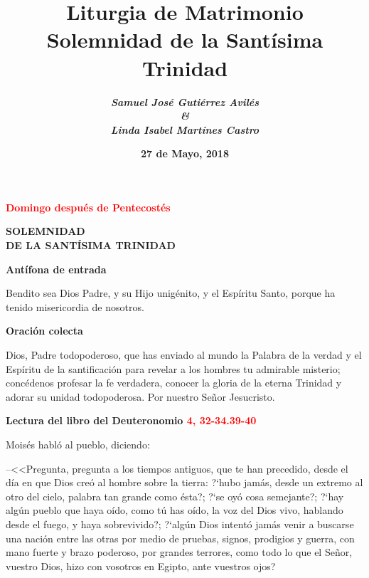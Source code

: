 \documentclass[12pt, letterpaper, spanish]{report}
\begin{document}
\title{%
	\Huge \bfseries Liturgia de Matrimonio \\
	\large Solemnidad de la Sant\'isima Trinidad
}
\author{%
	\Large \em \bfseries Samuel Jos\'e Guti\'errez Avil\'es \\ 
	\Large \em \bfseries \& \\ 
	\Large \em \bfseries Linda Isabel Mart\'ines Castro
}
\date{\bfseries 27 de Mayo, 2018}
\maketitle

\newpage

\begin{center} 
\Large {\bfseries \textcolor{red}{Domingo despu\'es de Pentecost\'es}}
\end{center}

\begin{center}
\huge {\bfseries SOLEMNIDAD \\ DE LA SANT\'ISIMA TRINIDAD}
\end{center}

\huge {\bfseries Ant\'ifona de entrada} \newline

\Large Bendito sea Dios Padre, y su Hijo unig\'enito, y el Esp\'iritu Santo, porque ha tenido misericordia de nosotros. \newline

\huge {\bfseries Oraci\'on colecta} \newline

\Large Dios, Padre todopoderoso, que has enviado al mundo la Palabra de la verdad
y el Esp\'iritu de la santificaci\'on para revelar a los hombres tu admirable misterio;
conc\'edenos profesar la fe verdadera, conocer la gloria de la eterna Trinidad
y adorar su unidad todopoderosa. Por nuestro Se\~nor Jesucristo. \newline

\Large {\bfseries Lectura del libro del Deuteronomio \hspace{1cm} \textcolor{red}{4, 32-34.39-40}} \newline

\Large Mois\'es habl\'o al pueblo, diciendo: \newline

--<<Pregunta, pregunta a los tiempos antiguos, que te han precedido, desde el d\'ia en que Dios 
cre\'o al hombre sobre la tierra: ?`hubo jam\'as, desde un extremo al otro del cielo, palabra tan 
grande como \'esta?; ?`se oy\'o cosa semejante?; ?`hay alg\'un pueblo que haya o\'ido, como t\'u has 
o\'ido, la voz del Dios vivo, hablando desde el fuego, y haya sobrevivido?; ?`alg\'un Dios intent\'o 
jam\'as venir a buscarse una naci\'on entre las otras por medio de pruebas, signos, prodigios y 
guerra, con mano fuerte y brazo poderoso, por grandes terrores, como todo lo que el Se\~nor, vuestro 
Dios, hizo con vosotros en Egipto, ante vuestros ojos? \newline
\end{document}
